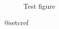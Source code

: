 \documentclass{article}
\begin{document}
\begin{figure}
  \caption{Test figure}\label{fig}
\end{figure}

\csname @setcref
\end{document}
